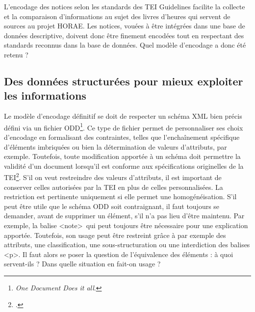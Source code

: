 \documentclass[a4paper,12pt,twoside]{book}
\begin{document}
L'encodage des notices selon les standards des TEI Guidelines facilite la collecte et la comparaison d'informations au sujet des livres d'heures qui servent de sources au projet HORAE. Les notices, vouées à être intégrées dans une base de données descriptive, doivent donc être finement encodées tout en respectant des standards reconnus dans la base de données. Quel modèle d'encodage a donc été retenu ?
	
	\subsection{\label{donnees_structurees_infos}Des données structurées pour mieux exploiter les informations}
	
	Le modèle d'encodage définitif se doit de respecter un schéma XML bien précis défini via un fichier ODD\footnote{\textit{One Document Does it all}.}. Ce type de fichier permet de personnaliser ses choix d'encodage en formalisant des contraintes, telles que l'enchaînement spécifique d'éléments imbriquées ou bien la détermination de valeurs d'attributs, par exemple. Toutefois, toute modification apportée à un schéma doit permettre la validité d'un document lorsqu'il est conforme aux spécifications originelles de la TEI\footcite{TEI_ODD_Camps}. S'il on veut restreindre des valeurs d'attributs, il est important de conserver celles autorisées par la TEI en plus de celles personnalisées. La restriction est pertinente uniquement si elle permet une homogénéisation. S'il peut être utile que le schéma ODD soit contraignant, il faut toujours se demander, avant de supprimer un élément, s’il n’a pas lieu d’être maintenu. Par exemple, la balise \textless note\textgreater~qui peut toujours être nécessaire pour une explication apportée. Toutefois, son usage peut être restreint grâce à par exemple des attributs, une classification, une sous-structuration ou une interdiction des balises \textless p\textgreater . Il faut alors se poser la question de l’équivalence des éléments : à quoi servent-ils ? Dans quelle situation en fait-on usage ?\\
	
\end{document}
